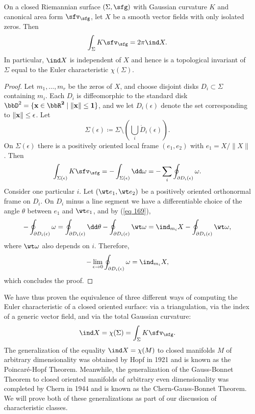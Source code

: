 \begin{thm}\label{thm poincare-hopf}
    On a closed Riemannian surface $(\Sigma,\sfg)$ with Gaussian curvature $K$ and canonical area form $\sfv_\sfg$, let $X$ be a smooth vector fields with only isolated zeros. Then 
    \[\int_\Sigma K\sfv_\sfg=2\pi \ind X.\]
    In particular, $\ind X$ is independent of $X$ and hence is a topological invariant of $\Sigma$ equal to the Euler characteristic $\chi(\Sigma)$.
\end{thm}
\begin{proof}
    Let $m_1,\ldots,m_r$ be the zeros of $X$, and choose disjoint disks $D_i\subset \Sigma$ containing $m_i$. Each $D_i$ is diffeomorphic to the standard disk $\bbD^2=\{\bf{x}\in\bbR^2\mid \lVert\bf{x}\rVert\leq 1\}$, and we let $D_i(\epsilon)$ denote the set corresponding to $\lVert \bf{x}\rVert\leq \epsilon$. Let 
    \[\Sigma(\epsilon)\coloneqq \Sigma\setminus \left(\bigcup_i \mathring{D}_i(\epsilon)\right).\]
    On $\Sigma(\epsilon)$ there is a positively oriented local frame $(e_1,e_2)$ with $e_1=X/\lVert X\rVert$. Then 
    \[\int_{\Sigma(\epsilon)}K\sfv_\sfg=-\int_{\Sigma(\epsilon)}\dd \omega=-\sum_i \oint_{\partial D_i(\epsilon)} \omega.\]
    Consider one particular $i$. Let $(\wt e_1,\wt e_2)$ be a positively oriented orthonormal frame on $D_i$. On $D_i$ minus a line segment we have a differentiable choice of the angle $\theta$ between $e_1$ and $\wt e_1$, and by (\ref{eq 169}),
    \[-\oint_{\partial D_i(\epsilon)}\omega=\oint_{\partial D_i(\epsilon)} \dd\theta-\oint_{\partial D_i(\epsilon)}\wt\omega=\ind_{m_i}X-\oint_{\partial D_i(\epsilon)}\wt\omega,\]
    where $\wt\omega$ also depends on $i$. Therefore, 
    \[-\lim_{\epsilon\to 0}\oint_{\partial D_i(\epsilon)}\omega=\ind_{m_i}X,\]
    which concludes the proof.
\end{proof}

\begin{rem}
    We have thus proven the equivalence of three different ways of computing the Euler characteristic of a closed oriented surface: via a triangulation, via the index of a generic vector field, and via the total Gaussian curvature:
    \[\ind X=\chi(\Sigma)=\int_\Sigma K\sfv_\sfg.\]
    The generalization of the equality $\ind X=\chi(M)$ to closed manifolds $M$ of arbitrary dimensionality was obtained by Hopf in 1921 and is known as the Poincar\'e-Hopf Theorem.  Meanwhile, the generalization of the Gauss-Bonnet Theorem to closed oriented manifolds of arbitrary even dimensionality was completed by Chern in 1944 and is known as the Chern-Gauss-Bonnet Theorem. We will prove both of these generalizations as part of our discussion of characteristic classes.
\end{rem}




